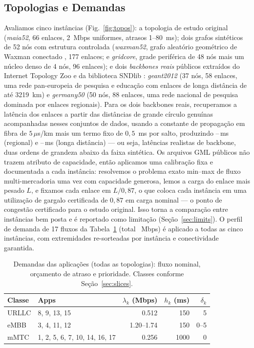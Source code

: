 \documentclass[journal]{IEEEtran}
\begin{document}
\subsection{Topologias e Demandas}
Avaliamos cinco instâncias (Fig.~\ref{fig:topos}): a topologia de estudo
original (\emph{maia52}, 66 enlaces, 2~Mbps uniformes, atrasos 1--80~ms);
dois grafos sintéticos de 52 nós com estrutura controlada
(\emph{waxman52}, grafo aleatório geométrico de Waxman conectado
\cite{waxman1988}, 177 enlaces; e \emph{gridcore}, grade periférica de 48 nós
mais um núcleo denso de 4 nós, 96 enlaces); e dois \emph{backbones reais}
públicos extraídos do Internet Topology Zoo \cite{topozoo} e da biblioteca
SNDlib \cite{sndlib2016}: \emph{geant2012} (37 nós, 58 enlaces, uma rede
pan-europeia de pesquisa e educação com enlaces de longa distância de até
3219~km) e \emph{germany50} (50 nós, 88 enlaces, uma rede nacional de
pesquisa dominada por enlaces regionais). Para os dois backbones reais,
recuperamos a latência dos enlaces a partir das distâncias de grande
círculo genuínas acompanhadas nesses conjuntos de dados, usando a constante
de propagação em fibra de $5\,\mu$s/km mais um termo fixo de
$0{,}5$~ms por salto, produzindo \AntDelayGerMin--\AntDelayGerMax\,ms
(regional) e \AntDelayGeantMin--\AntDelayGeantMax\,ms (longa distância) ---
ou seja, latências realistas de backbone, duas ordens de grandeza abaixo da
faixa sintética. Os arquivos GML públicos não trazem atributo de capacidade,
então aplicamos uma calibração fixa e documentada a cada instância:
resolvemos o problema exato min--max de fluxo multi-mercadoria uma vez com
capacidade generosa, lemos a carga do enlace mais pesado $L$, e fixamos
cada enlace em $L/0{,}87$, o que coloca cada instância em uma utilização de
gargalo certificada de $0{,}87$ em carga nominal --- o ponto de congestão
certificado para o estudo original. Isso torna a comparação entre instâncias
bem posta e é reportado como limitação (Seção~\ref{sec:limits}). O perfil de
demanda de 17 fluxos da Tabela~\ref{tab:apps} (total \TotalDemand~Mbps) é
aplicado a todas as cinco instâncias, com extremidades re-sorteadas por
instância e conectividade garantida.

\begin{table}[!t]
\caption{Demandas das aplicações (todas as topologias): fluxo nominal,
orçamento de atraso e prioridade. Classes conforme Seção~\ref{sec:slices}.}
\label{tab:apps}
\centering
\begin{tabular}{@{}llrrr@{}}
\toprule
Classe & Apps & $\lambda_k$ (Mbps) & $h_k$ (ms) & $\delta_k$\\
\midrule
URLLC & 8, 9, 13, 15 & 0.512 & 150 & 5\\
eMBB  & 3, 4, 11, 12  & 1.20--1.74 & 150 & 0--5\\
mMTC  & 1, 2, 5, 6, 7, 10, 14, 16, 17 & 0.256 & 1000 & 0\\
\bottomrule
\end{tabular}
\end{table}
\end{document}
